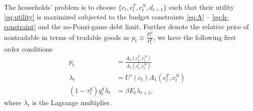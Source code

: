 The households' problem is to choose $\{c_t, c_t^T, c_t^N, d_{t+1}\}$ such that their utility \eqref{eq:utility} is maximized subjected to the budget constraints \eqref{eq:A} -- \eqref{eq:h-constraint} and the no-Ponzi-game debt limit.
Further denote the relative price of nontradable in terms of tradable goods as $p_t \equiv \frac{P^N_t}{P^T_t}$, we have the following first order conditions
\begin{subequations}
    \begin{align}
        p_t &= \frac{A_2(c_t^T, c_t^N)}{A_1(c_t^t, c_t^N)} \label{eq:FOC-HH-1} \\
        \lambda_t &= U'(c_t)A_1(c_t^T, c_t^N)\\
        (1-\tau_t^d)q_t^d \lambda_t &= \beta E_t \lambda_{t+1},
    \end{align}
\end{subequations}
where $\lambda_t$ is the Lagrange multiplier.